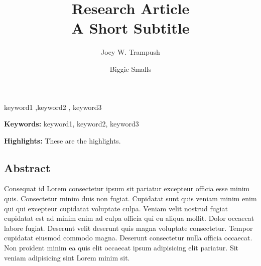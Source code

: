 \documentclass[
  super,
  preprint,
  3p]{elsarticle}
\renewcommand*\contentsname{Table of contents}
\newcommand\contentsname{Table of contents}
\begin{document}
\begin{frontmatter}
\title{Research Article \\\large{A Short Subtitle} }
\author[1]{Joey W. Trampush%
%
}
\author[2]{Biggie Smalls%
%
}


        





\begin{keyword}
    keyword1 \sep keyword2 \sep 
    keyword3
\end{keyword}
\end{frontmatter}
    \ifdefined\Shaded\renewenvironment{Shaded}{\begin{tcolorbox}[interior hidden, boxrule=0pt, frame hidden, breakable, enhanced, borderline west={3pt}{0pt}{shadecolor}, sharp corners]}{\end{tcolorbox}}\fi

\renewcommand*\contentsname{Table of contents}
{
\hypersetup{linkcolor=}
\setcounter{tocdepth}{3}
\tableofcontents
}
\textbf{Keywords:} keyword1, keyword2, keyword3

\textbf{Highlights:} These are the highlights.

\hypertarget{abstract}{%
\subsection{Abstract}\label{abstract}}

Consequat id Lorem consectetur ipsum sit pariatur excepteur officia esse
minim quis. Consectetur minim duis non fugiat. Cupidatat sunt quis
veniam minim enim qui qui excepteur cupidatat voluptate culpa. Veniam
velit nostrud fugiat cupidatat est ad minim enim ad culpa officia qui eu
aliqua mollit. Dolor occaecat labore fugiat. Deserunt velit deserunt
quis magna voluptate consectetur. Tempor cupidatat eiusmod commodo
magna. Deserunt consectetur nulla officia occaecat. Non proident minim
ea quis elit occaecat ipsum adipisicing elit pariatur. Sit veniam
adipisicing sint Lorem minim sit.
\end{document}
